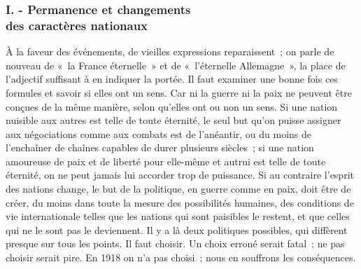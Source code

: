 \documentclass[french,twoside]{book} %
\begin{document}
\subsubsection[I. - Permanence et changements, des caractères nationaux]{I. - Permanence et changements \\
des caractères nationaux}
\noindent \par
À la faveur des événements, de vieilles expressions reparaissent ; on parle de nouveau de « la France éternelle » et de « l'éternelle Allemagne », la place de l'adjectif suffisant à en indiquer la portée. Il faut examiner une bonne fois ces formules et savoir si elles ont un sens. Car ni la guerre ni la paix ne peuvent être conçues de la même manière, selon qu'elles ont ou non un sens. Si une nation nuisible aux autres est telle de toute éternité, le seul but qu'on puisse assigner aux négociations comme aux combats est de l'anéantir, ou du moins de l'enchaîner de chaînes capables de durer plusieurs siècles ; si une nation amoureuse de paix et de liberté pour elle-même et autrui est telle de toute éternité, on ne peut jamais lui accorder trop de puissance. Si au contraire l'esprit des nations change, le but de la politique, en guerre comme en paix, doit être de créer, du moins dans toute la mesure des possibilités humaines, des conditions de vie internationale telles que les nations qui sont paisibles le restent, et que celles qui ne le sont pas le deviennent. Il y a là deux politiques possibles, qui diffèrent presque sur tous les points. Il faut choisir. Un choix erroné serait fatal ; ne pas choisir serait pire. En 1918 on n'a pas choisi ; nous en souffrons les conséquences.\par
\end{document}

